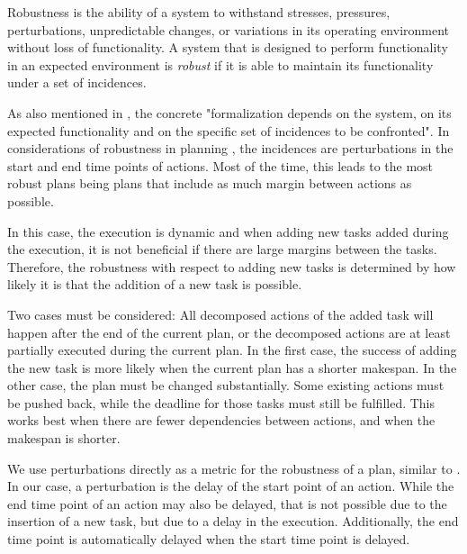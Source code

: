 \begin{definition}[Robustness]
    Robustness is the ability of a system to withstand stresses, pressures, perturbations, unpredictable changes, or variations in its operating environment without loss of functionality.
    A system that is designed to perform functionality in an expected environment is \emph{robust} if it is able to maintain its functionality under a set of incidences. \citep{barberRobustnessStabilityRecoverability2015}
\end{definition}

As also mentioned in \cite{barberRobustnessStabilityRecoverability2015}, the concrete "formalization depends on the system, on its expected functionality and on the specific set of incidences to be confronted".
In considerations of robustness in planning \citep{lundRobustExecutionProbabilistic2017}, the incidences are perturbations in the start and end time points of actions.
Most of the time, this leads to the most robust plans being plans that include as much margin between actions as possible.

In this case, the execution is dynamic and when adding new tasks added during the execution, it is not beneficial if there are large margins between the tasks.
Therefore, the robustness with respect to adding new tasks is determined by how likely it is that the addition of a new task is possible.

Two cases must be considered: All decomposed actions of the added task will happen after the end of the current plan, or the decomposed actions are at least partially executed during the current plan.
In the first case, the success of adding the new task is more likely when the current plan has a shorter makespan.
In the other case, the plan must be changed substantially.
Some existing actions must be pushed back, while the deadline for those tasks must still be fulfilled.
This works best when there are fewer dependencies between actions, and when the makespan is shorter.

We use perturbations directly as a metric for the robustness of a plan, similar to \cite{wehnerRobustVsFast2023}.
In our case, a perturbation is the delay of the start point of an action.
While the end time point of an action may also be delayed, that is not possible due to the insertion of a new task, but due to a delay in the execution.
Additionally, the end time point is automatically delayed when the start time point is delayed.

